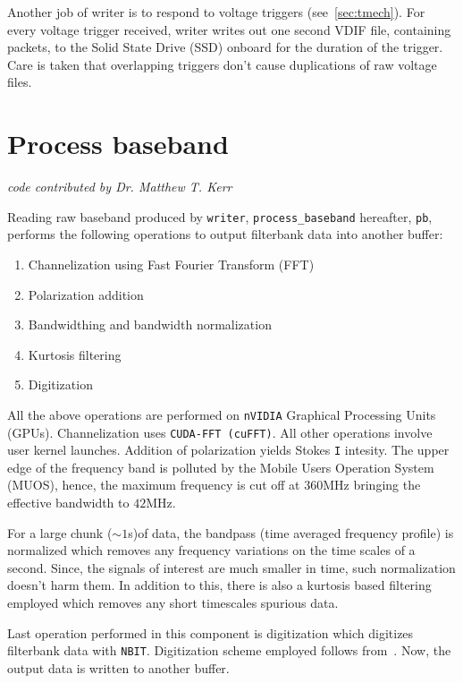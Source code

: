 \par Another job of writer is to respond to voltage triggers (see~\autoref{sec:tmech}). For every voltage trigger received, writer writes out one second VDIF file, containing packets, to the Solid State Drive (SSD) onboard for the duration of the trigger. Care is taken that overlapping triggers don't cause duplications of raw voltage files.

\section {Process baseband} 
\hfill \emph {code contributed by Dr. Matthew T. Kerr}

\par Reading raw baseband produced by \texttt{writer}, \texttt{process\_baseband} hereafter, \texttt{pb}, performs the following operations to output filterbank data into another \dada buffer:

\begin{enumerate}
\item Channelization using Fast Fourier Transform (FFT)
\item Polarization addition
\item Bandwidthing and bandwidth normalization
\item Kurtosis filtering
\item Digitization
\end{enumerate}

\par All the above operations are performed on \texttt{nVIDIA} Graphical Processing Units (GPUs). Channelization uses \texttt{CUDA-FFT (cuFFT)}. 
All other operations involve user kernel launches. Addition of polarization yields Stokes \texttt{I} intesity. The upper edge of the \vf frequency band is polluted by the Mobile Users Operation System (MUOS), hence, the maximum frequency is cut off at $360$MHz bringing the effective bandwidth to $42$MHz. 

\par For a large chunk ($\sim 1$s)of data, the bandpass (time averaged frequency profile) is normalized which removes any frequency variations on the time scales of a second. Since, the signals of interest are much smaller in time, such normalization doesn't harm them. In addition to this, there is also a kurtosis based filtering employed which removes any short timescales spurious data.

\par Last operation performed in this component is digitization which digitizes filterbank data with \texttt{NBIT}. Digitization scheme employed follows from~\cite{jenetanderson}. Now, the output data is written to another \dada buffer.


